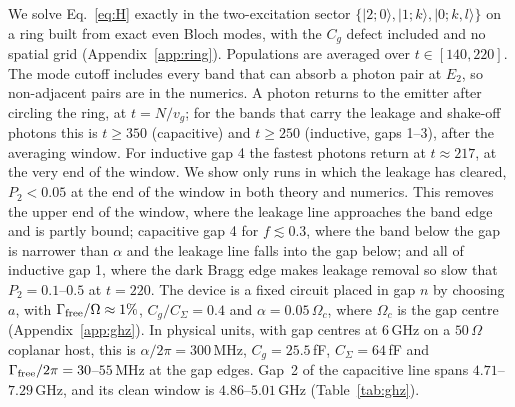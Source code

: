 \documentclass[aps,prresearch,twocolumn,superscriptaddress,nofootinbib,longbibliography,floatfix]{revtex4-2}
\begin{document}
We solve Eq.~\eqref{eq:H} exactly in the two-excitation sector $\{|2;0\rangle,|1;k\rangle,|0;k,l\rangle\}$ on a ring
built from exact even Bloch modes, with the $C_g$ defect included and no spatial grid (Appendix~\ref{app:ring}).
Populations are averaged over $t\in[140,220]$. The mode cutoff includes every band that can absorb a photon pair at
$E_2$, so non-adjacent pairs are in the numerics. A photon returns to the emitter after circling the ring, at
$t=N/v_g$; for the bands that carry the leakage and shake-off photons this is $t\ge350$ (capacitive) and $t\ge250$
(inductive, gaps 1--3), after the averaging window. For inductive gap 4 the fastest photons return at $t\approx217$, at
the very end of the window. We show only runs in which the leakage has cleared, $P_2<0.05$ at the end of the window in
both theory and numerics. This removes the upper end of the window, where the leakage line approaches the band edge and
is partly bound; capacitive gap 4 for $f\lesssim0.3$, where the band below the gap is narrower than $\alpha$ and the
leakage line falls into the gap below; and all of inductive gap 1, where the dark Bragg edge makes leakage removal so
slow that $P_2=0.1$--$0.5$ at $t=220$. The device is a
fixed circuit placed in gap $n$ by choosing $a$, with $\Gamma_{\rm free}/\Omega\approx1\%$, $C_g/C_\Sigma=0.4$ and
$\alpha=0.05\,\Omega_c$, where $\Omega_c$ is the gap centre (Appendix~\ref{app:ghz}). In physical units, with gap centres
at $6$\,GHz on a $50\,\Omega$ coplanar host, this is $\alpha/2\pi=300$\,MHz, $C_g=25.5$\,fF, $C_\Sigma=64$\,fF and
$\Gamma_{\rm free}/2\pi=30$--$55$\,MHz at the gap edges. Gap~2 of the capacitive line spans $4.71$--$7.29$\,GHz, and its
clean window is $4.86$--$5.01$\,GHz (Table~\ref{tab:ghz}).
\end{document}
